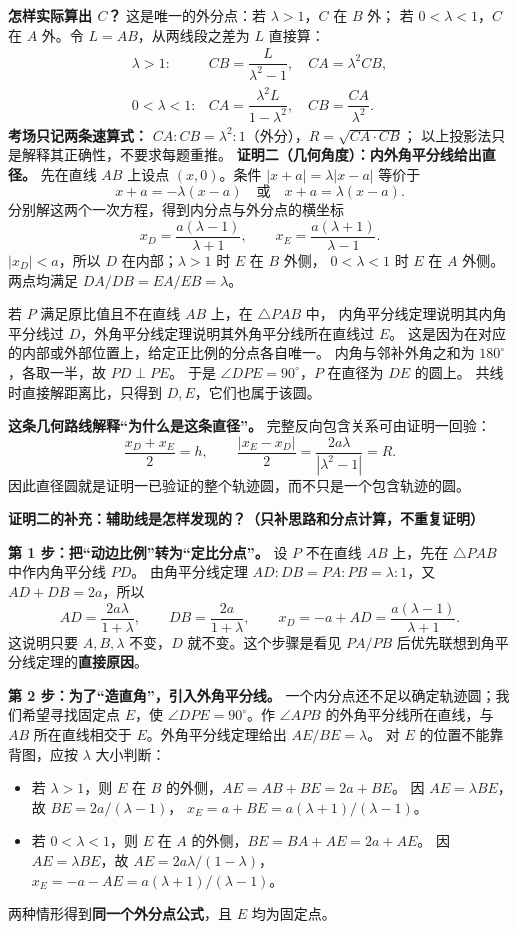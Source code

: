 \begin{proofbox}
\textbf{怎样实际算出 $C$？}
这是唯一的外分点：若 $\lambda>1$，$C$ 在 $B$ 外；
若 $0<\lambda<1$，$C$ 在 $A$ 外。令 $L=AB$，从两线段之差为 $L$ 直接算：
\[
 \begin{array}{ll}
 \lambda>1:& CB=\dfrac{L}{\lambda^2-1},\quad CA=\lambda^2 CB,\\[6pt]
 0<\lambda<1:& CA=\dfrac{\lambda^2L}{1-\lambda^2},\quad CB=\dfrac{CA}{\lambda^2}.
 \end{array}
\]
\textbf{考场只记两条速算式：} $CA:CB=\lambda^2:1$（外分），$R=\sqrt{CA\cdot CB}$；
以上投影法只是解释其正确性，不要求每题重推。
\tcbbreak
\textbf{证明二（几何角度）：内外角平分线给出直径。}
先在直线 $AB$ 上设点 $(x,0)$。条件 $|x+a|=\lambda|x-a|$ 等价于
\[
 x+a=-\lambda(x-a)\quad\text{或}\quad x+a=\lambda(x-a).
\]
分别解这两个一次方程，得到内分点与外分点的横坐标
\[
 x_D=\frac{a(\lambda-1)}{\lambda+1},\qquad
 x_E=\frac{a(\lambda+1)}{\lambda-1}.
\]
$|x_D|<a$，所以 $D$ 在内部；$\lambda>1$ 时 $E$ 在 $B$ 外侧，
$0<\lambda<1$ 时 $E$ 在 $A$ 外侧。两点均满足 $DA/DB=EA/EB=\lambda$。

若 $P$ 满足原比值且不在直线 $AB$ 上，在 $\triangle PAB$ 中，
内角平分线定理说明其内角平分线过 $D$，外角平分线定理说明其外角平分线所在直线过 $E$。
这是因为在对应的内部或外部位置上，给定正比例的分点各自唯一。
内角与邻补外角之和为 $180^\circ$，各取一半，故 $PD\perp PE$。
于是 $\angle DPE=90^\circ$，$P$ 在直径为 $DE$ 的圆上。
共线时直接解距离比，只得到 $D,E$，它们也属于该圆。

\textbf{这条几何路线解释“为什么是这条直径”。}
完整反向包含关系可由证明一回验：
\[
 \frac{x_D+x_E}{2}=h,\qquad
 \frac{|x_E-x_D|}{2}=\frac{2a\lambda}{|\lambda^2-1|}=R.
\]
因此直径圆就是证明一已验证的整个轨迹圆，而不只是一个包含轨迹的圆。

\medskip
\textbf{证明二的补充：辅助线是怎样发现的？（只补思路和分点计算，不重复证明）}

\textbf{第 1 步：把“动边比例”转为“定比分点”。}
设 $P$ 不在直线 $AB$ 上，先在 $\triangle PAB$ 中作内角平分线 $PD$。
由角平分线定理 $AD:DB=PA:PB=\lambda:1$，又 $AD+DB=2a$，所以
\[
 AD=\frac{2a\lambda}{1+\lambda},\qquad DB=\frac{2a}{1+\lambda},
 \qquad x_D=-a+AD=\frac{a(\lambda-1)}{\lambda+1}.
\]
这说明只要 $A,B,\lambda$ 不变，$D$ 就不变。这个步骤是看见
$PA/PB$ 后优先联想到角平分线定理的\textbf{直接原因}。

\textbf{第 2 步：为了“造直角”，引入外角平分线。}
一个内分点还不足以确定轨迹圆；我们希望寻找固定点 $E$，使
$\angle DPE=90^\circ$。作 $\angle APB$ 的外角平分线所在直线，与 $AB$
所在直线相交于 $E$。外角平分线定理给出 $AE/BE=\lambda$。
对 $E$ 的位置不能靠背图，应按 $\lambda$ 大小判断：
\begin{itemize}[leftmargin=*]
 \item 若 $\lambda>1$，则 $E$ 在 $B$ 的外侧，$AE=AB+BE=2a+BE$。
       因 $AE=\lambda BE$，故
       $BE=2a/(\lambda-1)$，
       $x_E=a+BE=a(\lambda+1)/(\lambda-1)$。
 \item 若 $0<\lambda<1$，则 $E$ 在 $A$ 的外侧，$BE=BA+AE=2a+AE$。
       因 $AE=\lambda BE$，故
       $AE=2a\lambda/(1-\lambda)$，
       $x_E=-a-AE=a(\lambda+1)/(\lambda-1)$。
\end{itemize}
两种情形得到\textbf{同一个外分点公式}，且 $E$ 均为固定点。


\end{proofbox}
